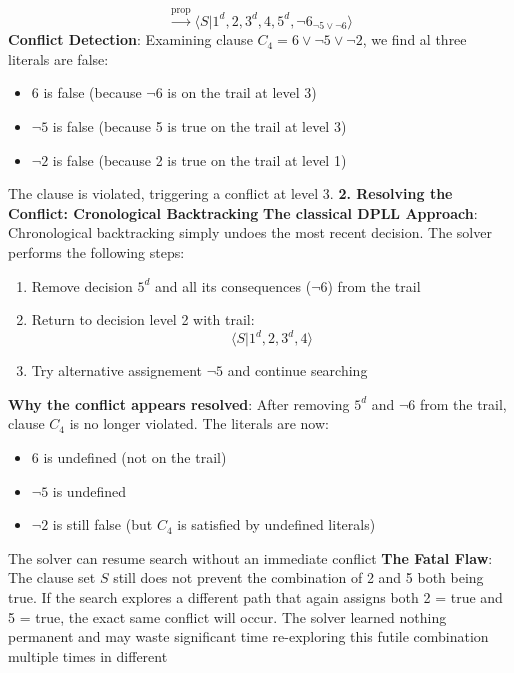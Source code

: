 \documentclass[a4paper]{article}
\theoremstyle{definition}
\begin{document}
\[
  \xrightarrow{\text{prop}} \langle S \vert 1^d, 2, 3^d, 4, 5^d, \lnot 6_{\lnot 5 \vee \lnot 6} \rangle
\]
\textbf{Conflict Detection}: Examining clause \( C_4 = 6 \vee \lnot 5 \vee \lnot 2 \), we find al three literals are false:
\begin{itemize}
  \item 6 is false (because $\lnot 6$ is on the trail at level 3)
  \item \( \lnot 5 \) is false (because 5 is true on the trail at level 3)
  \item \( \lnot 2 \) is false (because 2 is true on the trail at level 1)
\end{itemize}
The clause is violated, triggering a conflict at level 3.
\textbf{2. Resolving the Conflict: Cronological Backtracking}
\vspace{1em}
\noindent 
\newline
\textbf{The classical DPLL Approach}: Chronological backtracking simply undoes the most recent decision. The solver performs the following steps:
\begin{enumerate}
  \item Remove decision \( 5^d \) and all its consequences ($\lnot 6$) from the trail 
  \item Return to decision level 2 with trail:
  \[
    \langle S \vert 1^d, 2, 3^d, 4 \rangle
  \]
  \item Try alternative assignement \( \lnot 5 \) and continue searching
\end{enumerate}
\textbf{Why the conflict appears resolved}: After removing \( 5^d \) and \( \lnot 6 \) from the trail, clause \( C_4 \) is no longer violated.
The literals are now:
\begin{itemize}
  \item 6 is undefined (not on the trail)
  \item \( \lnot 5 \) is undefined 
  \item \( \lnot 2 \) is still false (but $C_4$ is satisfied by undefined literals)
\end{itemize}
The solver can resume search without an immediate conflict 
\vspace{1em}
\noindent 
\newline
\textbf{The Fatal Flaw}: The clause set \( S \) still does not prevent the combination of 2 and 5 both being true. If the 
search explores a different path that again assigns both 2 = true and 5 = true, the exact same conflict will occur. The solver 
learned nothing permanent and may waste significant time re-exploring this futile combination multiple times in different 
\end{document}
